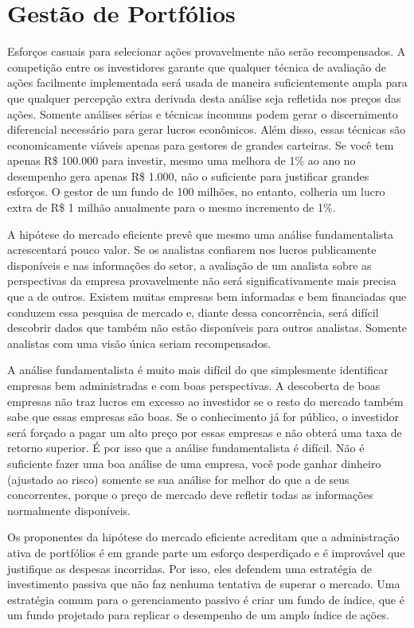 \chapter{Gestão de Portfólios}
\label{cap:gestao}

Esforços casuais para selecionar ações provavelmente não serão recompensados. A competição entre os investidores garante que qualquer técnica de avaliação de ações facilmente implementada será usada de maneira suficientemente ampla para que qualquer percepção extra derivada desta análise seja refletida nos preços das ações. Somente análises sérias e técnicas incomuns podem gerar o discernimento diferencial necessário para gerar lucros econômicos. Além disso, essas técnicas são economicamente viáveis apenas para gestores de grandes carteiras. Se você tem apenas R\$ 100.000 para investir, mesmo uma melhora de 1\% ao ano no desempenho gera apenas R\$ 1.000, não o suficiente para justificar grandes esforços. O gestor de um fundo de 100 milhões, no entanto, colheria um lucro extra de R\$ 1 milhão anualmente para o mesmo incremento de 1\%.

A hipótese do mercado eficiente prevê que mesmo uma análise fundamentalista acrescentará pouco valor. Se os analistas confiarem nos lucros publicamente disponíveis e nas informações do setor, a avaliação de um analista sobre as perspectivas da empresa provavelmente não será significativamente mais precisa que a de outros. Existem muitas empresas bem informadas e bem financiadas que conduzem essa pesquisa de mercado e, diante dessa concorrência, será difícil descobrir dados que também não estão disponíveis para outros analistas. Somente analistas com uma visão única seriam recompensados.

A análise fundamentalista é muito mais difícil do que simplesmente identificar empresas bem administradas e com boas perspectivas. A descoberta de boas empresas não traz lucros em excesso ao investidor se o resto do mercado também sabe que essas empresas são boas. Se o conhecimento já for público, o investidor será forçado a pagar um alto preço por essas empresas e não obterá uma taxa de retorno superior. É por isso que a análise fundamentalista é difícil. Não é suficiente fazer uma boa análise de uma empresa, você pode ganhar dinheiro (ajustado ao risco) somente se sua análise for melhor do que a de seus concorrentes, porque o preço de mercado deve refletir todas as informações normalmente disponíveis.

Os proponentes da hipótese do mercado eficiente acreditam que a administração ativa de portfólios é em grande parte um esforço desperdiçado e é improvável que justifique as despesas incorridas. Por isso, eles defendem uma estratégia de investimento passiva que não faz nenhuma tentativa de superar o mercado. Uma estratégia comum para o gerenciamento passivo é criar um fundo de índice, que é um fundo projetado para replicar o desempenho de um amplo índice de ações.

